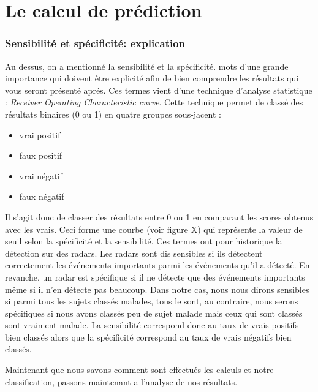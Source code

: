 \section{Le calcul de prédiction}


\subsubsection{Sensibilité et spécificité: explication}

Au dessus, on a mentionné la sensibilité et la spécificité. mots d'une grande importance qui doivent être explicité afin de bien comprendre les résultats qui vous seront présenté aprés. 
Ces termes vient d'une technique d'analyse statistique : \textit{Receiver Operating Characteristic curve}. Cette technique  permet de classé des résultats binaires (0 ou 1) en quatre groupes sous-jacent : 
\begin{itemize}
	\item vrai positif
	\item faux positif
	\item vrai négatif
	\item faux négatif
\end{itemize}

Il s'agit donc de classer des résultats entre 0 ou 1 en comparant les scores obtenus avec les vrais. Ceci forme une courbe (voir figure X) qui représente la valeur de seuil selon la spécificité et la sensibilité. 
Ces termes ont pour historique la détection sur des radars. Les radars sont dis sensibles si ils détectent correctement les événements importants parmi les événements qu'il a détecté. En revanche, un radar est spécifique si il ne détecte que des événements importants même si il n'en détecte pas beaucoup.  
Dans notre cas, nous nous dirons sensibles si parmi tous les sujets classés malades, tous le sont, au contraire, nous serons spécifiques si nous avons classés peu de sujet malade mais ceux qui sont classés sont vraiment malade.
La sensibilité correspond donc au taux de vrais positifs bien classés alors que la spécificité correspond au taux de vrais négatifs bien classés.  


Maintenant que nous savons comment sont effectués les calculs et notre classification, passons maintenant a l'analyse de nos résultats. 
